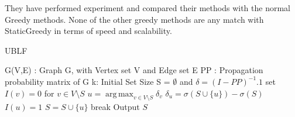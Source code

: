 \documentclass[english]{tktltiki}
\DeclareMathOperator*{\argmax}{arg\,max}
\begin{document}
They have performed experiment and compared their methods with the normal Greedy methods. None of the other greedy methods are any match with StaticGreedy in terms of speed and scalability.
\begin{algorithm}[ht!]
\caption{UBLF}
\label{alg:ublf}
\begin{algorithmic}
\Require G(V,E) : Graph G, with Vertex set V and Edge set E
\Require PP : Propagation probability matrix of G
\Require k: Initial Set Size
\State S = $\emptyset$ and $\delta = (I - PP)^{-1} .1$ 
	\State set $I(v) = 0$ for $v \in V \setminus S$
		\State $u =  \argmax_{v \in V \setminus S}\delta_v$ 
			\State $\delta_u = \sigma( S \cup \{u\}) - \sigma(S)$
			\State $I(u)=1$
		\EndIf
			\State $S = S \cup \{u\}$
			\State break
		\EndIf
	\EndWhile 
\EndFor
\State Output $S$
\end{algorithmic}
\end{algorithm}
\end{document}
